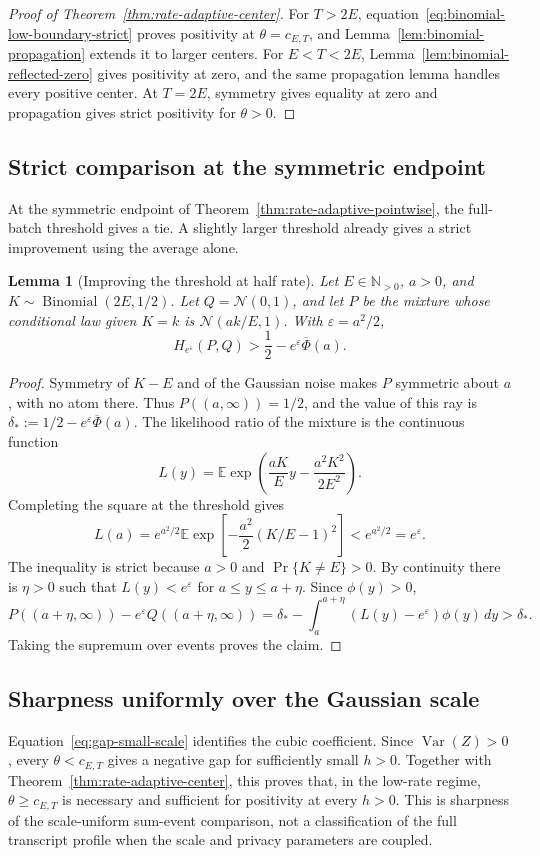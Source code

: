 \documentclass[11pt]{article}
\newtheorem{lemma}[theorem]{Lemma}
\theoremstyle{remark}
\newcommand{\N}{\mathbb N}
\newcommand{\E}{\mathbb E}
\newcommand{\Normal}{\mathcal N}
\begin{document}
\begin{proof}[Proof of Theorem~\ref{thm:rate-adaptive-center}]
For $T>2E$, equation~\eqref{eq:binomial-low-boundary-strict} proves positivity
at $\theta=c_{E,T}$, and Lemma~\ref{lem:binomial-propagation} extends it to
larger centers. For $E<T<2E$, Lemma~\ref{lem:binomial-reflected-zero} gives
positivity at zero, and the same propagation lemma handles every positive
center. At $T=2E$, symmetry gives equality at zero and propagation gives
strict positivity for $\theta>0$.
\end{proof}

\subsection*{Strict comparison at the symmetric endpoint}
At the symmetric endpoint of Theorem~\ref{thm:rate-adaptive-pointwise}, the
full-batch threshold gives a tie. A slightly larger threshold already
gives a strict improvement using the average alone.

\begin{lemma}[Improving the threshold at half rate]\label{lem:strict-average-endpoint}
Let $E\in\N_{>0}$, $a>0$, and $K\sim\operatorname{Binomial}(2E,1/2)$.
Let $Q=\Normal(0,1)$, and let $P$ be the mixture whose conditional law
given $K=k$ is $\Normal(ak/E,1)$. With $\varepsilon=a^2/2$,
\[
 H_{e^\varepsilon}(P, Q)
 >\frac12-e^\varepsilon\overline\Phi(a).
\]
\end{lemma}

\begin{proof}
Symmetry of $K-E$ and of the Gaussian noise makes $P$ symmetric about
$a$, with no atom there. Thus $P((a,\infty))=1/2$, and the value of this
ray is $\delta_*:=1/2-e^\varepsilon\overline\Phi(a)$.
The likelihood ratio of the mixture is the continuous function
\[
 L(y)=\E\exp\!\left(\frac{aK}{E}y-\frac{a^2K^2}{2E^2}\right).
\]
Completing the square at the threshold gives
\[
 L(a)=e^{a^2/2}\E\exp\!\left[
       -\frac{a^2}{2}(K/E-1)^2\right]<e^{a^2/2}=e^\varepsilon.
\]
The inequality is strict because $a>0$ and $\Pr\{K\ne E\}>0$.
By continuity there is $\eta>0$ such that $L(y)<e^\varepsilon$ for
$a\leq y\leq a+\eta$. Since $\phi(y)>0$,
\[
 P((a+\eta,\infty))-e^\varepsilon Q((a+\eta,\infty))
 =\delta_*-\int_a^{a+\eta}(L(y)-e^\varepsilon)\phi(y)\,dy
 >\delta_*.
\]
Taking the supremum over events proves the claim.
\end{proof}

\subsection*{Sharpness uniformly over the Gaussian scale}
Equation~\eqref{eq:gap-small-scale} identifies the cubic coefficient.
Since $\operatorname{Var}(Z)>0$, every $\theta<c_{E,T}$ gives a negative gap
for sufficiently small $h>0$. Together with
Theorem~\ref{thm:rate-adaptive-center}, this proves that, in the low-rate
regime, $\theta\geq c_{E,T}$ is necessary and sufficient for positivity at
every $h>0$. This is sharpness of the scale-uniform sum-event comparison,
not a classification of the full transcript profile when the scale and
privacy parameters are coupled.
\end{document}
